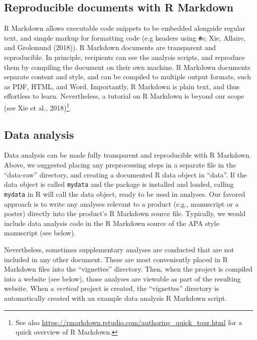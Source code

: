 \documentclass[
  english,
  jou,floatsintext]{apa6}
\begin{document}
\hypertarget{reproducible-documents-with-r-markdown}{%
\subsection{Reproducible documents with R Markdown}\label{reproducible-documents-with-r-markdown}}

R Markdown allows executable code snippets to be embedded alongside regular text, and simple markup for formatting code (e.g headers using \texttt{\#}s; Xie, Allaire, and Grolemund (2018)). R Markdown documents are transparent and reproducible. In principle, recipients can see the analysis scripts, and reproduce them by compiling the document on their own machine. R Markdown documents separate content and style, and can be compiled to multiple output formats, such as PDF, HTML, and Word. Importantly, R Markdown is plain text, and thus effortless to learn. Nevertheless, a tutorial on R Markdown is beyond our scope (see Xie et al., 2018)\footnote{See also \url{https://rmarkdown.rstudio.com/authoring_quick_tour.html} for a quick overview of R Markdown.}.

\hypertarget{data-analysis}{%
\subsection{Data analysis}\label{data-analysis}}

Data analysis can be made fully transparent and reproducible with R Markdown. Above, we suggested placing any preprocessing steps in a separate file in the ``data-raw'' directory, and creating a documented R data object in ``data''. If the data object is called \texttt{mydata} and the package is installed and loaded, calling \texttt{mydata} in R will call the data object, ready to be used in analyses. Our favored approach is to write any analyses relevant to a product (e.g., manuscript or a poster) directly into the product's R Markdown source file. Typically, we would include data analysis code in the R Markdown source of the APA style manuscript (see below).

Nevertheless, sometimes supplementary analyses are conducted that are not included in any other document. These are most conveniently placed in R Markdown files into the ``vignettes'' directory. Then, when the project is compiled into a website (see below), those analyses are viewable as part of the resulting website. When a \emph{vertical} project is created, the ``vignettes'' directory is automatically created with an example data analysis R Markdown script.
\end{document}
